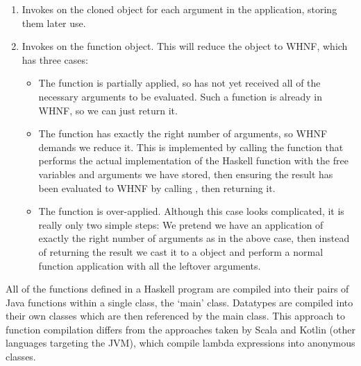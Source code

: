 \documentclass[dissertation.tex]{subfiles}
\begin{document}
{{{\begin{enumerate}
{                Cloning the function essentially maintains the same references to arguments and free variables, but creates new (non-shared) containers to hold them, avoiding the above issue.
                
                This is a shallow clone -- if we used a deep clone, recursively cloning the arguments and free variables, then we would lose the performance benefit of graph reduction where we can use an already computed value instead of recomputing it ourselves, and increase memory usage. 
            }
            \item
            {
                Invokes  on the cloned object for each argument in the application, storing them later use.
            }
            \item
            {
                Invokes  on the function object. This will reduce the object to WHNF, which has three cases:

                \begin{itemize}
                \item
                {
                    The function is partially applied, so has not yet received all of the necessary arguments to be evaluated. Such a function is already in WHNF, so we can just return it.
                }
                \item
                {
                    The function has exactly the right number of arguments, so WHNF demands we reduce it. This is implemented by calling the  function that performs the actual implementation of the Haskell function with the free variables and arguments we have stored, then ensuring the result has been evaluated to WHNF by calling , then returning it.
                }
                \item
                {
                    The function is over-applied. Although this case looks complicated, it is really only two simple steps: We pretend we have an application of exactly the right number of arguments as in the above case, then instead of returning the result we cast it to a  object and perform a normal function application with all the leftover arguments.
                }
                \end{itemize}
            }
            \end{enumerate}

            All of the functions defined in a Haskell program are compiled into their pairs of Java functions within a single class, the `main' class. Datatypes are compiled into their own classes which are then referenced by the main class. This approach to function compilation differs from the approaches taken by Scala and Kotlin (other languages targeting the JVM), which compile lambda expressions into anonymous classes.

}}}
\end{document}

